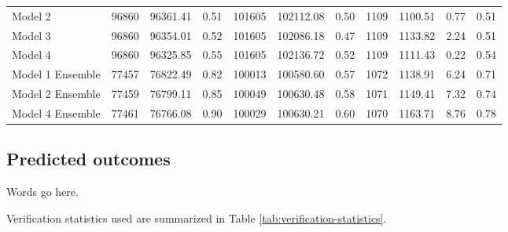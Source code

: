\documentclass[]{elsarticle} %
\begin{document}
\begin{landscape}
\begin{table}
\begin{tabular}[t]{lrrrrrrrrrr}
\hspace{1em}Model 2 & 96860 & 96361.41 & 0.51 & 101605 & 102112.08 & 0.50 & 1109 & 1100.51 & 0.77 & 0.51\\
\rowcolor{gray!15}
\hspace{1em}Model 3 & 96860 & 96354.01 & 0.52 & 101605 & 102086.18 & 0.47 & 1109 & 1133.82 & 2.24 & 0.51\\
\hspace{1em}Model 4 & 96860 & 96325.85 & 0.55 & 101605 & 102136.72 & 0.52 & 1109 & 1111.43 & 0.22 & 0.54\\
\rowcolor{gray!15}
\hspace{1em}Model 1 Ensemble & 77457 & 76822.49 & 0.82 & 100013 & 100580.60 & 0.57 & 1072 & 1138.91 & 6.24 & 0.71\\
\hspace{1em}Model 2 Ensemble & 77459 & 76799.11 & 0.85 & 100049 & 100630.48 & 0.58 & 1071 & 1149.41 & 7.32 & 0.74\\
\hspace{1em}Model 4 Ensemble & 77461 & 76766.08 & 0.90 & 100029 & 100630.21 & 0.60 & 1070 & 1163.71 & 8.76 & 0.78\\
\bottomrule
\end{tabular}
\end{table}
\end{landscape}

\hypertarget{predicted-outcomes}{%
\subsection{Predicted outcomes}\label{predicted-outcomes}}

Words go here.

Verification statistics used are summarized in Table
\ref{tab:verification-statistics}.
\end{document}
